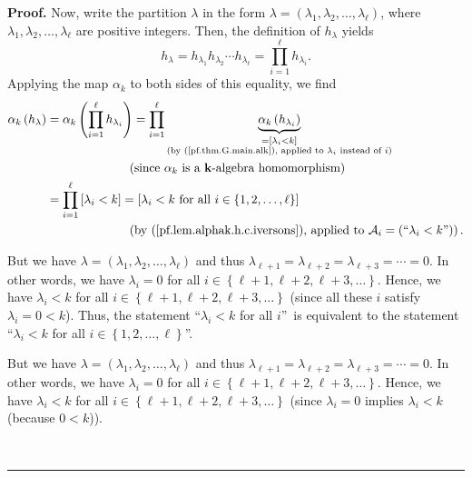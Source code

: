 \documentclass[numbers=enddot,12pt,final,onecolumn,notitlepage]{scrartcl}%
\theoremstyle{definition}
\newenvironment{proof}[1][Proof]{\noindent\textbf{#1.} }{\ \rule{0.5em}{0.5em}}
\let\prodnonlimits\prod
\renewcommand{\prod}{\prodnonlimits\limits}
\newenvironment{verlong}{}{}
\newenvironment{vershort}{}{}
\begin{document}
\begin{proof}
Now, write the partition $\lambda$ in the form $\lambda=\left(  \lambda
_{1},\lambda_{2},\ldots,\lambda_{\ell}\right)  $, where $\lambda_{1}%
,\lambda_{2},\ldots,\lambda_{\ell}$ are positive integers. Then, the
definition of $h_{\lambda}$ yields
\[
h_{\lambda}=h_{\lambda_{1}}h_{\lambda_{2}}\cdots h_{\lambda_{\ell}}%
=\prod_{i=1}^{\ell}h_{\lambda_{i}}.
\]
Applying the map $\alpha_{k}$ to both sides of this equality, we find%
\begin{align}
\alpha_{k}\left(  h_{\lambda}\right)   &  =\alpha_{k}\left(  \prod_{i=1}%
^{\ell}h_{\lambda_{i}}\right)  =\prod_{i=1}^{\ell}\underbrace{\alpha
_{k}\left(  h_{\lambda_{i}}\right)  }_{\substack{=\left[  \lambda
_{i}<k\right]  \\\text{(by (\ref{pf.thm.G.main.alk}), applied to }\lambda
_{i}\text{ instead of }i\text{)}}}\nonumber\\
&  \ \ \ \ \ \ \ \ \ \ \ \ \ \ \ \ \ \ \ \ \left(  \text{since }\alpha
_{k}\text{ is a }\mathbf{k}\text{-algebra homomorphism}\right) \nonumber\\
&  =\prod_{i=1}^{\ell}\left[  \lambda_{i}<k\right]  =\left[  \lambda
_{i}<k\text{ for all }i\in\left\{  1,2,\ldots,\ell\right\}  \right]
\label{pf.lem.alphak.h.c.2}\\
&  \ \ \ \ \ \ \ \ \ \ \ \ \ \ \ \ \ \ \ \ \left(  \text{by
(\ref{pf.lem.alphak.h.c.iversons}), applied to }\mathcal{A}_{i}=\left(
\text{\textquotedblleft}\lambda_{i}<k\text{\textquotedblright}\right)
\right)  .\nonumber
\end{align}


\begin{vershort}
But we have $\lambda=\left(  \lambda_{1},\lambda_{2},\ldots,\lambda_{\ell
}\right)  $ and thus $\lambda_{\ell+1}=\lambda_{\ell+2}=\lambda_{\ell
+3}=\cdots=0$. In other words, we have $\lambda_{i}=0$ for all $i\in\left\{
\ell+1,\ell+2,\ell+3,\ldots\right\}  $. Hence, we have $\lambda_{i}<k$ for all
$i\in\left\{  \ell+1,\ell+2,\ell+3,\ldots\right\}  $ (since all these $i$
satisfy $\lambda_{i}=0<k$). Thus, the statement \textquotedblleft$\lambda
_{i}<k$ for all $i$\textquotedblright\ is equivalent to the statement
\textquotedblleft$\lambda_{i}<k$ for all $i\in\left\{  1,2,\ldots
,\ell\right\}  $\textquotedblright.
\end{vershort}

\begin{verlong}
But we have $\lambda=\left(  \lambda_{1},\lambda_{2},\ldots,\lambda_{\ell
}\right)  $ and thus $\lambda_{\ell+1}=\lambda_{\ell+2}=\lambda_{\ell
+3}=\cdots=0$. In other words, we have $\lambda_{i}=0$ for all $i\in\left\{
\ell+1,\ell+2,\ell+3,\ldots\right\}  $. Hence, we have $\lambda_{i}<k$ for all
$i\in\left\{  \ell+1,\ell+2,\ell+3,\ldots\right\}  $ (since $\lambda_{i}=0$
implies $\lambda_{i}<k$ (because $0<k$)).


\end{verlong}
\end{proof}
\end{document}
